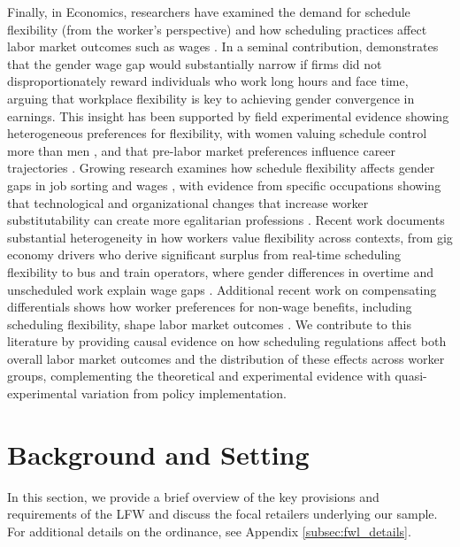 \documentclass[letterpaper,11pt,leqno]{article}
\theoremstyle{paper}
\begin{document}
Finally, in Economics, researchers have examined the demand for schedule flexibility (from the worker's perspective) and how scheduling practices affect labor market outcomes such as wages \citep{Maestas2023ValueOfWorkingConditions,mas2017valuing,mas2020alternative,wiswall2018preference}. In a seminal contribution, \cite{goldin2014grand} demonstrates that the gender wage gap would substantially narrow if firms did not disproportionately reward individuals who work long hours and face time, arguing that workplace flexibility is key to achieving gender convergence in earnings. This insight has been supported by field experimental evidence showing heterogeneous preferences for flexibility, with women valuing schedule control more than men \citep{mas2017valuing}, and that pre-labor market preferences influence career trajectories \citep{wiswall2018preference}. Growing research examines how schedule flexibility affects gender gaps in job sorting and wages \citep{goldin2011cost,goldin2021career,goldin2024parental}, with evidence from specific occupations showing that technological and organizational changes that increase worker substitutability can create more egalitarian professions \citep{goldin2016most}. Recent work documents substantial heterogeneity in how workers value flexibility across contexts, from gig economy drivers who derive significant surplus from real-time scheduling flexibility \citep{chen2019value} to bus and train operators, where gender differences in overtime and unscheduled work explain wage gaps \citep{bolotnyy2022why}. Additional recent work on compensating differentials shows how worker preferences for non-wage benefits, including scheduling flexibility, shape labor market outcomes \citep{lamadon2022imperfect,lavetti2023compensating}. We contribute to this literature by providing causal evidence on how scheduling regulations affect both overall labor market outcomes and the distribution of these effects across worker groups, complementing the theoretical and experimental evidence with quasi-experimental variation from policy implementation.



\section{Background and Setting} \label{sec:background}

In this section, we provide a brief overview of the key provisions and requirements of the LFW and discuss the focal retailers underlying our sample. For additional details on the ordinance, see Appendix \ref{subsec:fwl_details}.
\end{document}
